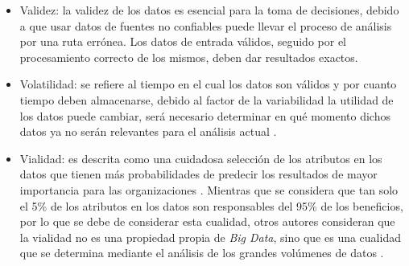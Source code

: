 \begin{itemize}
\item Validez: la validez de los datos es esencial para la toma de decisiones, debido a que usar datos de fuentes  no confiables puede llevar el proceso de análisis por una ruta errónea. Los datos de entrada válidos, seguido por el procesamiento correcto de los mismos, deben dar resultados exactos.

\item Volatilidad: se refiere al tiempo en el cual los datos son válidos y por cuanto tiempo deben almacenarse, debido al factor de la variabilidad la utilidad de los datos puede cambiar, será necesario determinar en qué momento dichos datos ya no serán relevantes para el análisis actual \cite{14}.

\item Vialidad: es descrita como una cuidadosa selección de los atributos en los datos que tienen más probabilidades de predecir los resultados de mayor importancia para las organizaciones \cite{18}. Mientras que se considera que tan solo el 5\% de los atributos en los datos son responsables del 95\% de los beneficios, por lo que se debe de considerar esta cualidad\cite{19}, otros autores consideran que la vialidad no es una propiedad propia de \emph{Big Data}, sino que es una cualidad que se determina mediante el análisis de los grandes volúmenes de datos  \cite{18}.

 \end{itemize}
 
 




